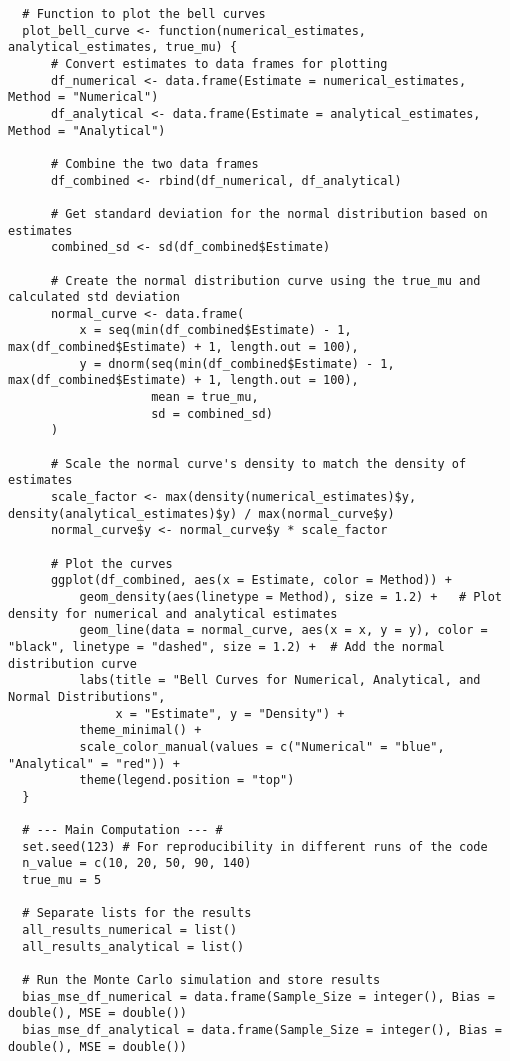 \documentclass{report}
\begin{document}
\begin{verbatim}
  # Function to plot the bell curves
  plot_bell_curve <- function(numerical_estimates, analytical_estimates, true_mu) {
      # Convert estimates to data frames for plotting
      df_numerical <- data.frame(Estimate = numerical_estimates, Method = "Numerical")
      df_analytical <- data.frame(Estimate = analytical_estimates, Method = "Analytical")
      
      # Combine the two data frames
      df_combined <- rbind(df_numerical, df_analytical)
      
      # Get standard deviation for the normal distribution based on estimates
      combined_sd <- sd(df_combined$Estimate)
  
      # Create the normal distribution curve using the true_mu and calculated std deviation
      normal_curve <- data.frame(
          x = seq(min(df_combined$Estimate) - 1, max(df_combined$Estimate) + 1, length.out = 100),
          y = dnorm(seq(min(df_combined$Estimate) - 1, max(df_combined$Estimate) + 1, length.out = 100),
                    mean = true_mu,
                    sd = combined_sd)
      )
      
      # Scale the normal curve's density to match the density of estimates
      scale_factor <- max(density(numerical_estimates)$y, density(analytical_estimates)$y) / max(normal_curve$y)
      normal_curve$y <- normal_curve$y * scale_factor
  
      # Plot the curves
      ggplot(df_combined, aes(x = Estimate, color = Method)) +
          geom_density(aes(linetype = Method), size = 1.2) +   # Plot density for numerical and analytical estimates
          geom_line(data = normal_curve, aes(x = x, y = y), color = "black", linetype = "dashed", size = 1.2) +  # Add the normal distribution curve
          labs(title = "Bell Curves for Numerical, Analytical, and Normal Distributions",
               x = "Estimate", y = "Density") +
          theme_minimal() +
          scale_color_manual(values = c("Numerical" = "blue", "Analytical" = "red")) +
          theme(legend.position = "top")
  }
  
  # --- Main Computation --- #
  set.seed(123) # For reproducibility in different runs of the code
  n_value = c(10, 20, 50, 90, 140)
  true_mu = 5
  
  # Separate lists for the results
  all_results_numerical = list() 
  all_results_analytical = list()
  
  # Run the Monte Carlo simulation and store results
  bias_mse_df_numerical = data.frame(Sample_Size = integer(), Bias = double(), MSE = double())
  bias_mse_df_analytical = data.frame(Sample_Size = integer(), Bias = double(), MSE = double())
  

\end{verbatim}
\end{document}
